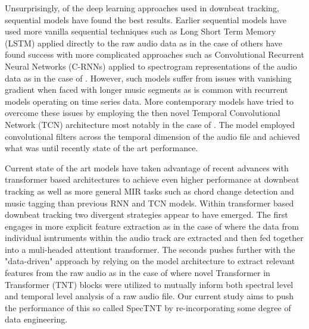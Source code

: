 \documentclass[conference]{IEEEtran}
\begin{document}
Unsurprisingly, of the deep learning approaches used in downbeat tracking, sequential
models have found the best results. Earlier sequential models have used more vanilla
sequential techniques such as Long Short Term Memory (LSTM) applied directly to the raw audio data as in the case of 
\cite{b5} others have found success with more complicated approaches such as
Convolutional Recurrent Neural Networks (C-RNNs) applied to spectrogram representations
of the audio data as in the case of \cite{b6}. However, such models suffer from issues
with vanishing gradient when faced with longer music segments as is common with recurrent models
operating on time series data. More contemporary models have tried to overcome these issues by employing the then novel
Temporal Convolutional Network (TCN) architecture most notably in the case of \cite{b7}. The model employed convolutional filters across
the temporal dimension of the audio file and achieved what was until recently state of the art performance. 

Current state of the art models have taken advantage of recent advances with transformer based
architectures to achieve even higher performance at downbeat tracking as well as more general
MIR tasks such as chord change detection and music tagging than previous RNN and TCN models.
Within transformer based downbeat tracking two divergent strategies appear to have emerged. The first engages in
more explicit feature extraction as in the case of \cite{b8} where the data from individual isntruments
within the audio track are extracted and then fed together into a muli-headed attentiont transformer. The seconds
pushes further with the "data-driven" approach by relying on the model architecture to extract relevant features
from the raw audio as in the case of \cite{b9} where novel Transformer in Transformer (TNT) blocks were utilized
to mutually inform both spectral level and temporal level analysis of a raw audio file. Our current study aims to push the performance of
this so called SpecTNT by re-incorporating some degree of data engineering.
\end{document}
